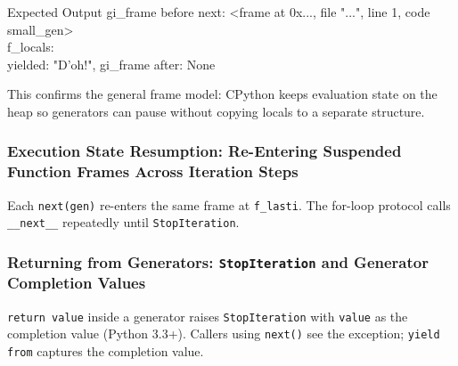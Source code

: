 \begin{iobox}{Expected Output}
gi\_frame before next: <frame at 0x..., file "...", line 1, code small\_gen> \\
f\_locals: {} \\
yielded: "D'oh!", gi\_frame after: None \\
\end{iobox}




This confirms the general frame model: CPython keeps evaluation state on the heap so generators can pause without copying locals to a separate structure.

\subsubsection{Execution State Resumption: Re-Entering Suspended Function Frames Across Iteration Steps}

Each \texttt{next(gen)} re-enters the same frame at \texttt{f\_lasti}. The for-loop protocol calls \texttt{\_\_next\_\_} repeatedly until \texttt{StopIteration}.

\subsubsection{Returning from Generators: \texttt{StopIteration} and Generator Completion Values}

\texttt{return value} inside a generator raises \texttt{StopIteration} with \texttt{value} as the completion value (Python 3.3+). Callers using \texttt{next()} see the exception; \texttt{yield from} captures the completion value.
